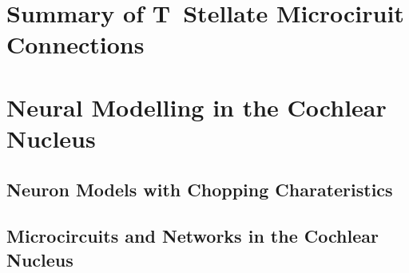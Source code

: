 \documentclass[10pt,a4paper,twoside,openright]{book}
\begin{document}





\section{Summary of T~Stellate Microciruit Connections}


\begin{landscape}
{\small{}}  
\end{landscape}


\section{Neural Modelling in the Cochlear Nucleus}

\subsection{Neuron Models with Chopping Charateristics}

\subsection{Microcircuits and Networks in the Cochlear Nucleus}

\begin{landscape}
{\small{}}  
\end{landscape}






 

\newpage
\listoftodos
\end{document}
